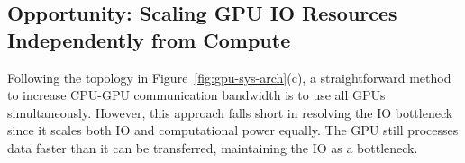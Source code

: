 \begin{comment}
In recent years, server-class CPUs (AMD Milan, Rome, Genoa) have started to provide more PCIe lanes, resulting in an architecture where GPUs directly connect to the CPU though separate PCIe links, as illustrated in Figure~\ref{fig:gpu-sys-arch} (c).
When all four GPUs are connected to CPUs, the aggregated unidirectional PCIe bandwidth is comparable to CPU DRAM bandwidth, and the bidirectional bandwidth even surpasses the CPU DRAM bandwidth.
Given that it is usually difficult for CPUs to fully utilize the DRAM bandwidth, it is time to re-evaluate the assumption that CPU-GPU communication bandwidth is always a bottleneck. 
\end{comment}

\subsection{Opportunity: Scaling GPU IO Resources Independently from Compute} \label{subsection:scaling_gpu_io_independently}

Following the topology in Figure~\ref{fig:gpu-sys-arch}(c), a straightforward method to increase CPU-GPU communication bandwidth is to use all GPUs simultaneously. 
However, this approach falls short in resolving the IO bottleneck since it scales both IO and computational power equally. 
The GPU still processes data faster than it can be transferred, maintaining the IO as a bottleneck. 

\begin{comment}
A straightforward way to increase the CPU-GPU communication bandwidth is to use all the GPUs together.
However, it cannot solve the IO bottleneck because it scales both IO and compute power equally.
The GPU side still consumes data faster than it transfers, keeping IO a bottleneck.
\textit{This suggests that an ideal solution is to take the bandwidth of all the PCIe links but only use one GPU to do the computation.}
\end{comment}

